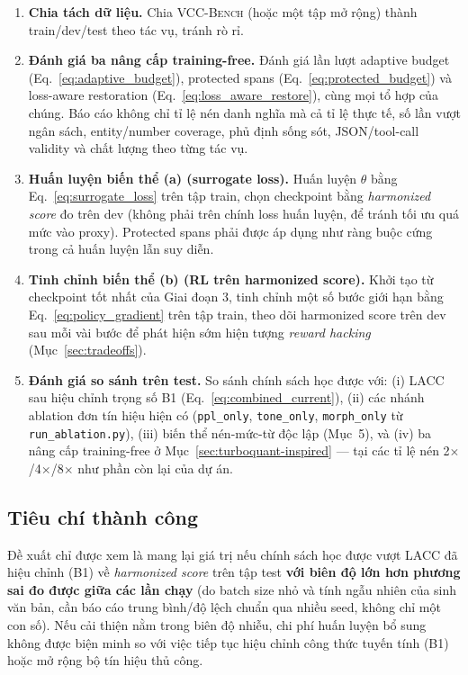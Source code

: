 \documentclass[12pt,a4paper]{article}
\newcommand{\method}[1]{\textsc{#1}}         %
\begin{document}
\begin{enumerate}[label=\textbf{Giai đoạn \arabic*}:,leftmargin=*]
    \item \textbf{Chia tách dữ liệu.} Chia \method{VCC-Bench} (hoặc một tập mở rộng) thành train/dev/test theo tác vụ, tránh rò rỉ.
    \item \textbf{Đánh giá ba nâng cấp training-free.} Đánh giá lần lượt adaptive budget (Eq.~\ref{eq:adaptive_budget}), protected spans (Eq.~\ref{eq:protected_budget}) và loss-aware restoration (Eq.~\ref{eq:loss_aware_restore}), cùng mọi tổ hợp của chúng. Báo cáo không chỉ tỉ lệ nén danh nghĩa mà cả tỉ lệ thực tế, số lần vượt ngân sách, entity/number coverage, phủ định sống sót, JSON/tool-call validity và chất lượng theo từng tác vụ.
    \item \textbf{Huấn luyện biến thể (a) (surrogate loss).} Huấn luyện $\theta$ bằng Eq.~\ref{eq:surrogate_loss} trên tập train, chọn checkpoint bằng \textit{harmonized score} đo trên dev (không phải trên chính loss huấn luyện, để tránh tối ưu quá mức vào proxy). Protected spans phải được áp dụng như ràng buộc cứng trong cả huấn luyện lẫn suy diễn.
    \item \textbf{Tinh chỉnh biến thể (b) (RL trên harmonized score).} Khởi tạo từ checkpoint tốt nhất của Giai đoạn 3, tinh chỉnh một số bước giới hạn bằng Eq.~\ref{eq:policy_gradient} trên tập train, theo dõi harmonized score trên dev sau mỗi vài bước để phát hiện sớm hiện tượng \textit{reward hacking} (Mục~\ref{sec:tradeoffs}).
    \item \textbf{Đánh giá so sánh trên test.} So sánh chính sách học được với: (i) \method{LACC} sau hiệu chỉnh trọng số B1 (Eq.~\ref{eq:combined_current}), (ii) các nhánh ablation đơn tín hiệu hiện có (\texttt{ppl\_only}, \texttt{tone\_only}, \texttt{morph\_only} từ \texttt{run\_ablation.py}), (iii) biến thể nén-mức-từ độc lập (Mục~5), và (iv) ba nâng cấp training-free ở Mục~\ref{sec:turboquant-inspired} --- tại các tỉ lệ nén 2$\times$/4$\times$/8$\times$ như phần còn lại của dự án.
\end{enumerate}

\subsection{Tiêu chí thành công}

Đề xuất chỉ được xem là mang lại giá trị nếu chính sách học được vượt \method{LACC} đã hiệu chỉnh (B1) về \textit{harmonized score} trên tập test \textbf{với biên độ lớn hơn phương sai đo được giữa các lần chạy} (do batch size nhỏ và tính ngẫu nhiên của sinh văn bản, cần báo cáo trung bình/độ lệch chuẩn qua nhiều seed, không chỉ một con số). Nếu cải thiện nằm trong biên độ nhiễu, chi phí huấn luyện bổ sung không được biện minh so với việc tiếp tục hiệu chỉnh công thức tuyến tính (B1) hoặc mở rộng bộ tín hiệu thủ công.
\end{document}
